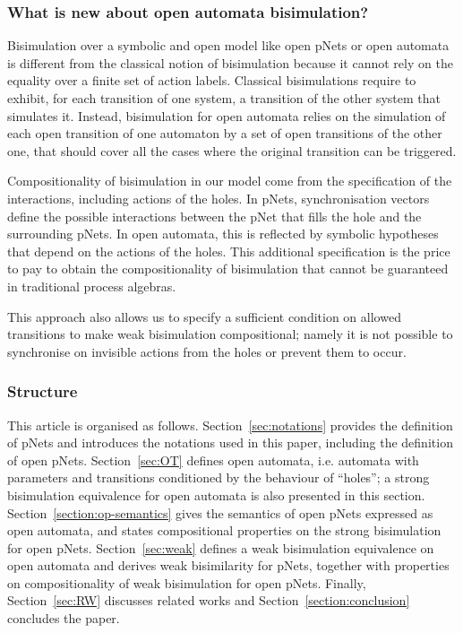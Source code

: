 \documentclass{elsarticle}
\begin{document}
\subsubsection*{What is new about open automata bisimulation?}

Bisimulation over a symbolic and open model like open pNets or open automata is  different from the classical notion of bisimulation because it cannot rely on the equality over a finite set of action labels. Classical bisimulations require to exhibit, for each transition of one system, a transition of the other system that simulates it. Instead, bisimulation for open automata  relies on the simulation of each open transition of one automaton by a set of open transitions of the other one, that should cover all the 
cases where the original transition can be triggered.

Compositionality of bisimulation in our model come from the specification of the interactions, including actions of the holes. In pNets, synchronisation vectors define the possible interactions between the pNet that fills the hole and the surrounding pNets. In open automata, this is reflected by symbolic hypotheses that depend on the actions of the holes. This additional specification is the price to pay to obtain the compositionality of bisimulation that cannot be guaranteed in traditional process algebras. 

This approach also allows us to specify a sufficient condition on allowed transitions to make weak bisimulation compositional; namely it is not possible to synchronise on invisible actions from the holes or prevent them to occur.


\subsubsection*{Structure}
This article is organised as follows. Section~\ref{sec:notations}
provides the definition of pNets and introduces the notations used in
this paper, including the definition of open pNets. 
Section~\ref{sec:OT} defines open automata, i.e. automata
with parameters and transitions conditioned by the behaviour of
``holes''; a strong bisimulation equivalence for open automata is also
presented in this section. 
Section~\ref{section:op-semantics} gives
the semantics of open pNets expressed as open automata, and states
compositional properties on the strong bisimulation for open
pNets. 
Section~\ref{sec:weak} defines a weak bisimulation
equivalence on open automata and derives weak bisimilarity for pNets,
together with properties on compositionality of weak bisimulation for
open pNets. 
Finally, Section~\ref{sec:RW} discusses related works and Section~\ref{section:conclusion} concludes the
paper. 
\end{document}

